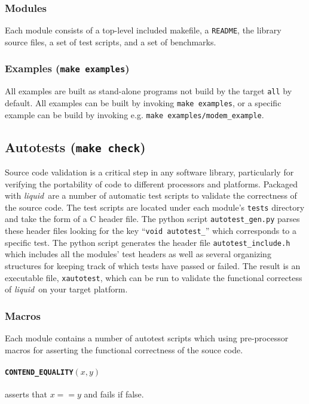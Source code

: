 \documentclass[11pt,twoside]{report}
\newcommand{\liquid}{{\it liquid}}
\begin{document}
\subsubsection{Modules}
Each module consists of a top-level included makefile, a {\tt README}, the
library source files, a set of test scripts, and a set of benchmarks.

\subsubsection{Examples ({\tt make examples})}
All examples are built as stand-alone programs not build by the target
{\tt all} by default.
All examples can be built by invoking {\tt make examples}, or a specific
example can be build by invoking e.g. {\tt make examples/modem\_example}.

\subsection{Autotests ({\tt make check})}
\label{ch:installation:targets:autotests}
Source code validation is a critical step in any software library,
particularly for verifying the portability of code to different processors and
platforms.
Packaged with \liquid\ are a number of automatic test scripts to validate the
correctness of the source code.
The test scripts are located under each module's {\tt tests} directory and
take the form of a C header file.
The python script {\tt autotest\_gen.py} parses these header files looking for
the key ``{\tt void autotest\_}'' which corresponds to a specific test.
The python script generates the header file {\tt autotest\_include.h} which
includes all the modules' test headers as well as several organizing
structures for keeping track of which tests have passed or failed.
The result is an executable file, {\tt xautotest}, which can be run to
validate the functional correctess of \liquid\ on your target platform.

\subsubsection{Macros}
Each module contains a number of autotest scripts which using pre-processor
macros for asserting the functional correctness of the souce code.

\paragraph{{\tt CONTEND\_EQUALITY}$(x,y)$} asserts that $x==y$ and fails if
false.
\end{document}
